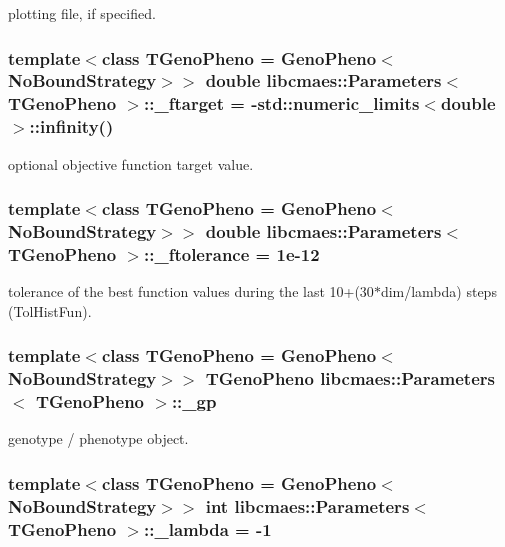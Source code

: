 plotting file, if specified. \hypertarget{classlibcmaes_1_1Parameters_a837dbcfba351a043441076a11666f92c}{
\subsubsection[{\-\_\-ftarget}]{\setlength{\rightskip}{0pt plus 5cm}template$<$class T\-Geno\-Pheno = Geno\-Pheno$<$\-No\-Bound\-Strategy$>$$>$ double {\bf libcmaes\-::\-Parameters}$<$ T\-Geno\-Pheno $>$\-::\-\_\-ftarget = -\/std\-::numeric\-\_\-limits$<$double$>$\-::infinity()}}\label{classlibcmaes_1_1Parameters_a837dbcfba351a043441076a11666f92c}
optional objective function target value. \hypertarget{classlibcmaes_1_1Parameters_ab6c11cc112b5709e9039967e881c808e}{
\subsubsection[{\-\_\-ftolerance}]{\setlength{\rightskip}{0pt plus 5cm}template$<$class T\-Geno\-Pheno = Geno\-Pheno$<$\-No\-Bound\-Strategy$>$$>$ double {\bf libcmaes\-::\-Parameters}$<$ T\-Geno\-Pheno $>$\-::\-\_\-ftolerance = 1e-\/12}}\label{classlibcmaes_1_1Parameters_ab6c11cc112b5709e9039967e881c808e}
tolerance of the best function values during the last 10+(30$\ast$dim/lambda) steps (Tol\-Hist\-Fun). \hypertarget{classlibcmaes_1_1Parameters_ab8e153b4785de9358599caa840b94ef2}{
\subsubsection[{\-\_\-gp}]{\setlength{\rightskip}{0pt plus 5cm}template$<$class T\-Geno\-Pheno = Geno\-Pheno$<$\-No\-Bound\-Strategy$>$$>$ T\-Geno\-Pheno {\bf libcmaes\-::\-Parameters}$<$ T\-Geno\-Pheno $>$\-::\-\_\-gp}}\label{classlibcmaes_1_1Parameters_ab8e153b4785de9358599caa840b94ef2}
genotype / phenotype object. \hypertarget{classlibcmaes_1_1Parameters_af732f7206f23cbd6ec2bbd4e217a9a2b}{
\subsubsection[{\-\_\-lambda}]{\setlength{\rightskip}{0pt plus 5cm}template$<$class T\-Geno\-Pheno = Geno\-Pheno$<$\-No\-Bound\-Strategy$>$$>$ int {\bf libcmaes\-::\-Parameters}$<$ T\-Geno\-Pheno $>$\-::\-\_\-lambda = -\/1}}\label{classlibcmaes_1_1Parameters_af732f7206f23cbd6ec2bbd4e217a9a2b}
